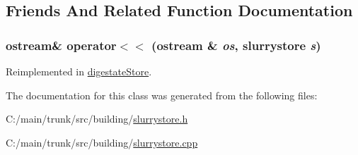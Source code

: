 \subsection{Friends And Related Function Documentation}
\hypertarget{classslurrystore_a74247370258ba08c974e190aca4ed0a5}{
\subsubsection[{operator$<$$<$}]{\setlength{\rightskip}{0pt plus 5cm}ostream\& operator$<$$<$ (ostream \& {\em os}, \/  {\bf slurrystore} {\em s})}}
\label{classslurrystore_a74247370258ba08c974e190aca4ed0a5}


Reimplemented in \hyperlink{classdigestate_store_afe43a1f833661ff0491a2b3f4a2a0c24}{digestateStore}.

The documentation for this class was generated from the following files:\begin{DoxyCompactItemize}
\item 
C:/main/trunk/src/building/\hyperlink{slurrystore_8h}{slurrystore.h}\item 
C:/main/trunk/src/building/\hyperlink{slurrystore_8cpp}{slurrystore.cpp}\end{DoxyCompactItemize}
